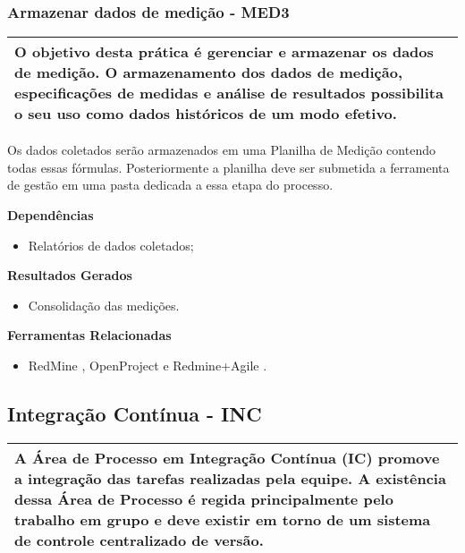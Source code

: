 \subsubsection{Armazenar dados de medição - MED3 }
\label{sec:med3}

\begin{table}[!ht]
\centering
\begin{tabular}{|p{130mm}|}
\hline
O objetivo desta prática é gerenciar e armazenar os dados de medição. O armazenamento dos dados de medição, especificações de medidas e análise de resultados possibilita o seu uso como dados históricos de um modo efetivo. \\ 
\hline
\end{tabular}
\end{table}

Os dados coletados serão armazenados em uma Planilha de Medição contendo todas essas fórmulas. Posteriormente a planilha deve ser submetida a ferramenta de gestão em uma pasta dedicada a essa etapa do processo.

\textbf{Dependências}

\begin{itemize}
    \item Relatórios de dados coletados;
\end{itemize}

\textbf{ Resultados Gerados }
\begin{itemize}
    \item Consolidação das medições.
\end{itemize}

\textbf{ Ferramentas Relacionadas }
\begin{itemize}
    \item RedMine \cite{Redmine}, OpenProject \cite{OpenProject} e Redmine+Agile \cite{RedmineUP}.
\end{itemize}

\subsection{Integração Contínua - INC}
\label{sec:inc}

\begin{table}[!ht]
\centering
\begin{tabular}{|p{130mm}|}
\hline
A Área de Processo em Integração Contínua (IC) promove a integração das tarefas realizadas pela equipe. A existência dessa Área de Processo é regida principalmente pelo trabalho em grupo e deve existir em torno de um sistema de controle centralizado de versão. \\
\hline
\end{tabular}
\end{table}

